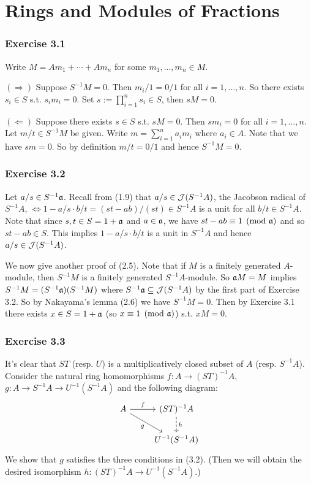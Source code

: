 \documentclass[../A&M.tex]{subfiles}
\begin{document}
\chapter{Rings and Modules of Fractions}

\subsection*{Exercise 3.1}

Write $M = Am_1 + \cdots + Am_n$ for some $m_1,\ldots,m_n \in M$.

$(\Rightarrow)$ Suppose $S^{-1}M = 0$. Then $m_i/1 = 0/1$ for all $i=1,\ldots,n$. So there exists $s_i \in S$ s.t. $s_im_i = 0$. Set $s:=\prod_{i=1}^n s_i \in S$, then $sM=0$.

$(\Leftarrow)$ Suppose there exists $s\in S$ s.t. $sM=0$. Then $sm_i = 0$ for all $i=1,\ldots,n$. Let $m/t \in S^{-1}M$ be given. Write $m = \sum_{i=1}^n a_im_i$ where $a_i\in A$. Note that we have $sm = 0$. So by definition $m/t = 0/1$ and hence $S^{-1}M=0$.

\subsection*{Exercise 3.2}

Let $a/s \in S^{-1}\mathfrak{a}$. Recall from (1.9) that $a/s \in \mathcal{J}(S^{-1}A)$, the Jacobson radical of $S^{-1}A$, $\iff 1-a/s \cdot b/t = (st - ab)/(st) \in S^{-1}A$ is a unit for all $b/t \in S^{-1}A$. Note that since $s,t \in S = 1 + \mathfrak{a}$ and $a\in\mathfrak{a}$, we have $st - ab \equiv 1 \pmod{\mathfrak{a}}$ and so $st - ab \in S$. This implies $1-a/s \cdot b/t$ is a unit in $S^{-1}A$ and hence $a/s \in \mathcal{J}(S^{-1}A)$.

We now give another proof of (2.5). Note that if $M$ is a finitely generated $A$-module, then $S^{-1}M$ is a finitely generated $S^{-1}A$-module. So $\mathfrak{a} M=M$ implies $S^{-1}M = (S^{-1}\mathfrak{a})(S^{-1}M)$ where $S^{-1}\mathfrak{a} \subseteq \mathcal{J}(S^{-1}A)$ by the first part of Exercise 3.2. So by Nakayama's lemma (2.6) we have $S^{-1}M=0$. Then by Exercise 3.1 there exists $x\in S = 1 + \mathfrak{a}$ (so $x \equiv 1 \pmod{\mathfrak{a}}$) s.t. $xM=0$.

\subsection*{Exercise 3.3}

It's clear that $ST$ (resp. $U$) is a multiplicatively closed subset of $A$ (resp. $S^{-1}A$). Consider the natural ring homomorphisms $f:A \to (ST)^{-1}A$, $g:A \to S^{-1}A \to U^{-1}(S^{-1}A)$ and the following diagram:
$$
\begin{tikzcd}
  A \arrow[r, "f"] \arrow[dr, "g"'] & (ST)^{-1}A \arrow[d, dashrightarrow, "h"]   \\
										& U^{-1}(S^{-1}A)
\end{tikzcd}
$$
We show that $g$ satisfies the three conditions in (3.2). (Then we will obtain the desired isomorphism $h: (ST)^{-1}A \to U^{-1}(S^{-1}A)$.)
\end{document}
